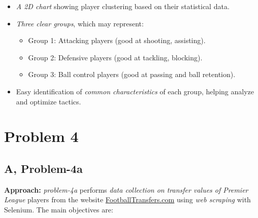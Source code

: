 \documentclass[12pt]{article}
\begin{document}
\begin{itemize}
    \item \textit{A 2D chart} showing player clustering based on their statistical data.
    \item \textit{Three clear groups}, which may represent:
    
    \begin{itemize}
        \item Group  1: Attacking players (good at shooting, assisting).
        \item Group  2: Defensive players (good at tackling, blocking).
        \item Group  3: Ball control players (good at passing and ball retention).
    \end{itemize}
    
    \item Easy identification of \textit{common characteristics} of each group, helping analyze and optimize tactics.
\end{itemize}

\section{Problem 4}

\subsection*{A, Problem-4a}

\textbf{Approach:} \textit{problem-4a} performs \textit{data collection on transfer values of Premier League} players from the website \href{https://www.footballtransfers.com/en}{FootballTransfers.com} using \textit{web scraping} with Selenium. The main objectives are:
\end{document}
